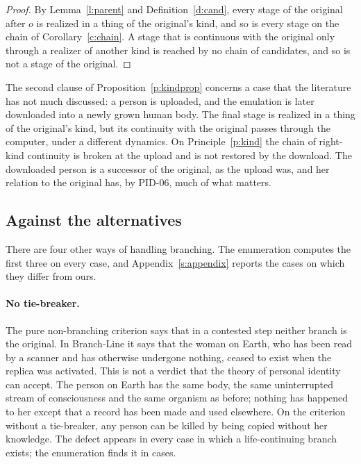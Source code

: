 \documentclass{situationist-preprint}
\begin{document}
\begin{proof}
By Lemma~\ref{l:parent} and Definition~\ref{d:cand}, every stage of the original after $o$ is realized in a thing of the original's kind, and so is every stage on the chain of Corollary~\ref{c:chain}. A stage that is continuous with the original only through a realizer of another kind is reached by no chain of candidates, and so is not a stage of the original.
\end{proof}

The second clause of Proposition~\ref{p:kindprop} concerns a case that the literature has not much discussed: a person is uploaded, and the emulation is later downloaded into a newly grown human body. The final stage is realized in a thing of the original's kind, but its continuity with the original passes through the computer, under a different dynamics. On Principle~\ref{p:kind} the chain of right-kind continuity is broken at the upload and is not restored by the download. The downloaded person is a successor of the original, as the upload was, and her relation to the original has, by PID-06, much of what matters.

\subsection{Against the alternatives}

There are four other ways of handling branching. The enumeration computes the first three on every case, and Appendix~\ref{s:appendix} reports the cases on which they differ from ours.

\paragraph{No tie-breaker.} The pure non-branching criterion says that in a contested step neither branch is the original. In Branch-Line it says that the woman on Earth, who has been read by a scanner and has otherwise undergone nothing, ceased to exist when the replica was activated. This is not a verdict that the theory of personal identity can accept. The person on Earth has the same body, the same uninterrupted stream of consciousness and the same organism as before; nothing has happened to her except that a record has been made and used elsewhere. On the criterion without a tie-breaker, any person can be killed by being copied without her knowledge. The defect appears in every case in which a life-continuing branch exists; the enumeration finds it in \stdisP{} cases.
\end{document}
